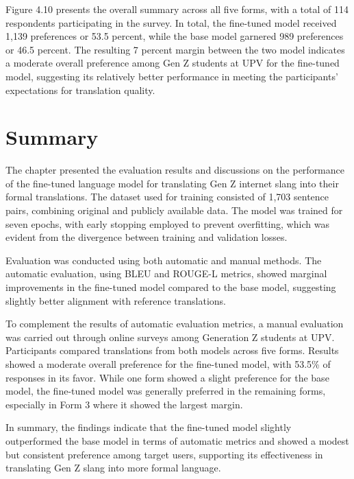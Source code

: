 Figure 4.10 presents the overall summary across all five forms, with a total of 114 respondents participating in the survey. In total, the fine-tuned model received 1,139 preferences or 53.5 percent, while the base model garnered 989 preferences or 46.5 percent. The resulting 7 percent margin between the two model indicates a moderate overall preference among Gen Z students at UPV for the fine-tuned model, suggesting its relatively better performance in meeting the participants' expectations for translation quality. 

\section{Summary}
The chapter presented the evaluation results and discussions on the performance of the fine-tuned language model for translating Gen Z internet slang into their formal translations. The dataset used for training consisted of 1,703 sentence pairs, combining original and publicly available data. The model was trained for seven epochs, with early stopping employed to prevent overfitting, which was evident from the divergence between training and validation losses.

Evaluation was conducted using both automatic and manual methods. The automatic evaluation, using BLEU and ROUGE-L metrics, showed marginal improvements in the fine-tuned model compared to the base model, suggesting slightly better alignment with reference translations. 

To complement the results of automatic evaluation metrics, a manual evaluation was carried out through online surveys among Generation Z students at UPV. Participants compared translations from both models across five forms. Results showed a moderate overall preference for the fine-tuned model, with 53.5\% of responses in its favor. While one form showed a slight preference for the base model, the fine-tuned model was generally preferred in the remaining forms, especially in Form 3 where it showed the largest margin.

In summary, the findings indicate that the fine-tuned model slightly outperformed the base model in terms of automatic metrics and showed a modest but consistent preference among target users, supporting its effectiveness in translating Gen Z slang into more formal language.
